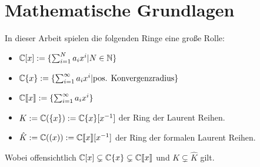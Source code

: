\chapter{Mathematische Grundlagen}

\begin{comment}
Hier werde ich mich auf \cite{sabbah_cimpa90} und \cite{coutinho1995primer}
beziehen.
\end{comment}

In dieser Arbeit spielen die folgenden Ringe eine große Rolle:
\begin{itemize}
\item $\mathbb{C}[x]:=\{ \sum^{N}_{i=1}a_ix^i | N\in \mathbb{N} \}$
\item $\mathbb{C}\{x\}:=\{ \sum^{\infty}_{i=1}a_ix^i | \mbox{pos.
  Konvergenzradius} \}$
\item $\mathbb{C}\llbracket x\rrbracket:=\{ \sum^{\infty}_{i=1}a_ix^i \}$
\item $K:=\mathbb{C}(\{x\}):=\mathbb{C}\{x\}[x^{-1}]$ der Ring der Laurent Reihen.
\item $\hat{K}:=\mathbb{C}((x)):=\mathbb{C}\llbracket x\rrbracket[x^{-1}]$ der Ring der
formalen Laurent Reihen.
\end{itemize}
Wobei offensichtlich $\mathbb{C}[x]\subsetneq\mathbb{C}\{x\}\subsetneq{\mathbb C\llbracket x\rrbracket}$ und
$K\subsetneq\hat K$ gilt.

\begin{comment}
Es bezeichnet der Hut ($ \, \hat \,\, $) das jeweils formale äquivalent zu
einem konvergentem Objekt.
\end{comment}

\begin{comment}
\begin{lem}[Seite 2]
ein paar eigenschaften
\begin{enumerate}
\item $\C[x]$ ist ein graduierter Ring, durch die Grad der
Polynome. Diese graduierung induziert eine aufsteigende Filtrierung.

alle Ideale haben die form $(x-a)$ mit $a\in \C$
\item wenn $\mathfrak{m}$ das maximale Ideal von $\C[x]$ (erzeugt von
$x$ ist), so ist
\[
  \C[[x]]=
  \underset{k}{\underleftarrow{\lim}} \C[X]\backslash\mathfrak{m}^k
\]
The ring $\C[[x]]$ ist ein nöterscher lokaler Ring:
jede Potenzreihe mit konstantem term $\neq 0$ ist invertierbar.

Der ring ist ebenfalls ein diskreter ??? Ring (discrete valuation
ring)

Die Filtrierung nach grad des Maximalen Ideals, genannt
$\mathfrak{m}$-adische Fitration, ist die Filtrierung
$\mathfrak{m}^k=\{f\in \C[[x]]|v(f)\geq k\}$

und es gilt $gr_\mathfrak{m}(\C[[x]])=\C[x]$
\end{enumerate}
\end{lem}
\end{comment}

